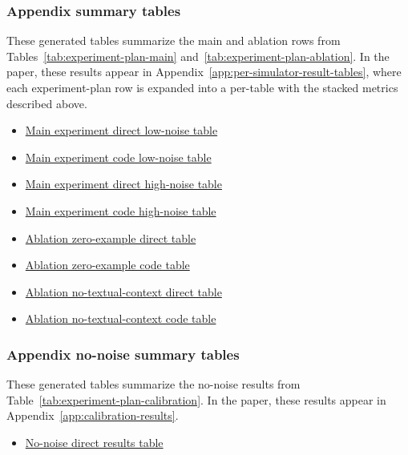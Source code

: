\documentclass[11pt]{article}
\begin{document}
\subsubsection*{Appendix summary tables}
These generated tables summarize the main and ablation rows from Tables~\ref{tab:experiment-plan-main} and~\ref{tab:experiment-plan-ablation}.
In the paper, these results appear in Appendix~\ref{app:per-simulator-result-tables}, where each experiment-plan row is expanded into a per-\termSimulator table with the stacked metrics described above.
\begin{itemize}
  \item \hyperref[tab:app-per-simulator-gentle-01234-cloud]{Main experiment direct low-noise table}
  \item \hyperref[tab:app-per-simulator-gentle-01234-flame]{Main experiment code low-noise table}
  \item \hyperref[tab:app-per-simulator-gentle-01234-pine]{Main experiment direct high-noise table}
  \item \hyperref[tab:app-per-simulator-gentle-01234-orbit]{Main experiment code high-noise table}
  \item \hyperref[tab:app-per-simulator-frost-01234-pine]{Ablation zero-example direct table}
  \item \hyperref[tab:app-per-simulator-frost-01234-orbit]{Ablation zero-example code table}
  \item \hyperref[tab:app-per-simulator-gentle-01234-harbor]{Ablation no-textual-context direct table}
  \item \hyperref[tab:app-per-simulator-gentle-01234-tide]{Ablation no-textual-context code table}
\end{itemize}

\subsubsection*{Appendix no-noise summary tables}
These generated tables summarize the no-noise results from Table~\ref{tab:experiment-plan-calibration}.
In the paper, these results appear in Appendix~\ref{app:calibration-results}.
\begin{itemize}
  \item \hyperref[tab:app-calibration-frost-01234-anchor]{No-noise direct results table}
\end{itemize}
\end{document}
